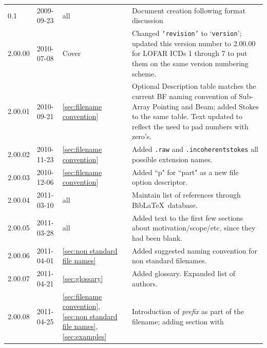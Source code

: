 \documentclass[a4paper,10pt,bibtotoc]{scrartcl}
\begin{document}
\begin{center}
  \tablelasttail{\hline}
  \begin{supertabular}{lllp{10cm}}
    0.1 & 2009-09-23 & all & Document creation following format discussion \\
    2.00.00  & 2010-07-08 & Cover & Changed \texttt{`revision'} to
    `\texttt{version}';  updated  this version number to 2.00.00 for
    LOFAR ICDs 1 through 7 to put them on the same version numbering scheme.\\
    2.00.01 & 2010-09-21 & \ref{sec:filename convention} &  Optional
    Description table matches the current BF naming convention of
    Sub-Array Pointing and Beam;  added Stokes to the same table.
    Text updated to reflect the need to pad numbers with zero's. \\
    2.00.02 & 2010-11-23 & \ref{sec:filename convention} & Added \texttt{.raw} and
    \texttt{.incoherentstokes} all possible extension names. \\
    2.00.03 & 2010-12-06 & \ref{sec:filename convention} & Added ``p"
    for ``part" as a new file option descriptor.\\ 
    2.00.04 & 2011-03-10 & all & Maintain list of references through
    Bib\LaTeX\ database. \\
    2.00.05 & 2011-03-28 & all & Added text to the first few sections 
    about motivation/scope/etc, since they had been blank. \\
    2.00.06 & 2011-04-01 & \ref{sec:non standard file names} & Added
    suggested naming convention for non standard filenames. \\
    2.00.07 & 2011-04-21 & \ref{sec:glossary} & Added glossary.
    Expanded list of authors. \\
    2.00.08 & 2011-04-25 & \ref{sec:filename convention}, \ref{sec:non
      standard file names}, \ref{sec:examples} & Introduction of
    \textsl{prefix} as part of the filename; adding section with

\end{supertabular}
\end{center}
\end{document}
